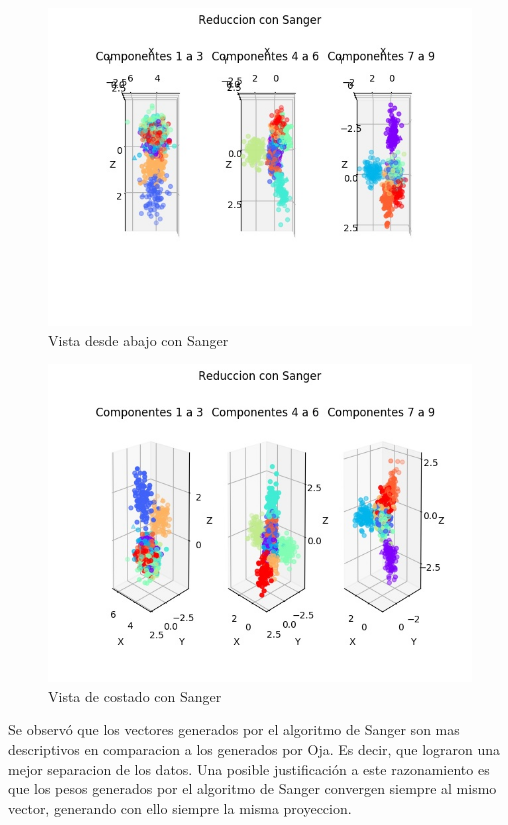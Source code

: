 \begin{figure}[H]
  \includegraphics[width=160mm]{imagenes/reduccion_Sanger_2.jpg}
  \caption{Vista desde abajo con Sanger}
\end{figure}

\begin{figure}[H]
  \includegraphics[width=160mm]{imagenes/reduccion_Sanger_3.jpg}
  \caption{Vista de costado con Sanger}
\end{figure}

Se observó que los vectores generados por el algoritmo de Sanger son mas descriptivos en comparacion a los generados por Oja.
 Es decir, que lograron una mejor separacion de los datos. Una posible justificación a este razonamiento es que los pesos generados
  por el algoritmo de Sanger convergen siempre al mismo vector, generando con ello siempre la misma proyeccion.

